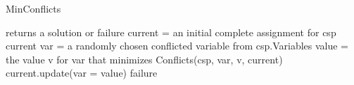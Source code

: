 \begin{algorithm}[H]
    \caption{MinConflicts}
    \begin{algorithmic}[1]
         returns a solution or failure
        \State current = an initial complete assignment for csp
        \State \Return current
        \EndIf
        \State var = a randomly chosen conflicted variable from csp.Variables
        \State value = the value v for var that minimizes Conflicts(csp, var, v, current)
        \State current.update({var = value})
        \EndFor
        \State \Return failure
        \EndProcedure
    \end{algorithmic}
\end{algorithm}

\newpage